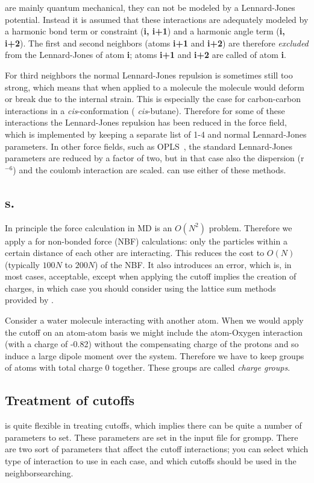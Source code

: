 are mainly
quantum mechanical, they can not be modeled by a Lennard-Jones potential.
Instead it is assumed that these interactions are adequately modeled
by a harmonic bond term or constraint ({\bf i, i+1}) and a harmonic angle term
({\bf i, i+2}). The first and second neighbors (atoms {\bf i+1} and {\bf i+2}) 
are therefore
{\em excluded} from the Lennard-Jones  
of atom {\bf i};
atoms {\bf i+1} and {\bf i+2} are called {\em {}} of atom {\bf i}.

For third neighbors the normal Lennard-Jones repulsion is sometimes
still too strong, which means that when applied to a molecule the
molecule would deform or break due to the internal strain. This is
especially the case for carbon-carbon interactions in a {\em
cis}-conformation ({\eg} {\em cis}-butane).  Therefore for some of these
interactions the Lennard-Jones repulsion has been reduced in the
{\gromos} force field, which is implemented by keeping a separate list of
1-4 and normal Lennard-Jones parameters. In other force fields, such
as OPLS~\cite{Jorgensen88}, the standard Lennard-Jones parameters are reduced
by a factor of two, but in that case also the dispersion (r$^{-6}$)
and the coulomb interaction are scaled.
{\gromacs} can use either of these methods.

\subsection{s.}
\label{sec:cg}
In principle the force calculation in MD is an $O(N^2)$ problem.
Therefore we apply a  for non-bonded force (NBF)
calculations: only the particles within a certain distance of each
other are interacting. This reduces the cost to $O(N)$ (typically
$100N$ to $200N$) of the NBF. It also introduces an error, which is,
in most cases, acceptable, except when applying the cutoff implies
the creation of charges, in which case you should consider using the
lattice sum methods provided by {\gromacs}.

Consider a water molecule interacting with another atom. When we would apply
the cutoff on an atom-atom basis we might include the atom-Oxygen
interaction (with a charge of -0.82) without the compensating charge
of the protons and so induce a large dipole moment over the system.
Therefore we have to keep groups of atoms with total charge
0 together. These groups are called {\em charge groups}.

\subsection{Treatment of cutoffs}
\newcommand{\rs}{$r_{short}$}
\newcommand{\rl}{$r_{long}$}
{\gromacs} is quite flexible in treating cutoffs, which implies
there can be quite a number of parameters to set. These parameters are
set in the input file for grompp. There are two sort of parameters
that affect the cutoff interactions; you can select which type
of interaction to use in each case, and which cutoffs should be
used in the neighborsearching.

